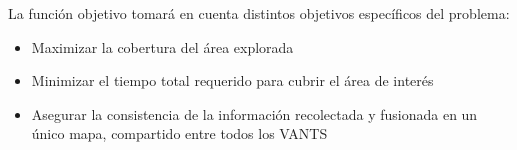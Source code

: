 \documentclass[sigconf]{acmart}
\begin{document}





La funci\'{o}n objetivo tomar\'{a} en cuenta distintos objetivos espec\'{i}ficos del problema:
\begin{itemize}
\item Maximizar la cobertura del \'{a}rea explorada 
\item Minimizar el tiempo total requerido para cubrir el \'{a}rea de inter\'{e}s
\item Asegurar la consistencia de la información recolectada y fusionada en un único mapa, compartido entre todos los VANTS
\end{itemize}
\end{document}
